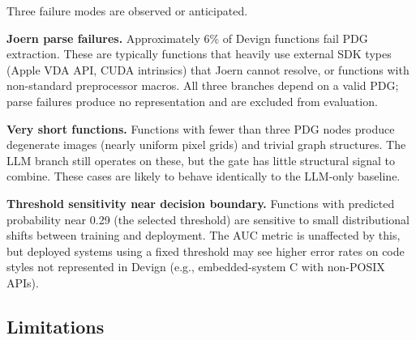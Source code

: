 Three failure modes are observed or anticipated.

\textbf{Joern parse failures.} Approximately 6\% of Devign functions fail PDG
extraction. These are typically functions that heavily use external SDK types
(Apple VDA API, CUDA intrinsics) that Joern cannot resolve, or functions with
non-standard preprocessor macros. All three branches depend on a valid PDG; parse
failures produce no representation and are excluded from evaluation.

\textbf{Very short functions.} Functions with fewer than three PDG nodes produce
degenerate images (nearly uniform pixel grids) and trivial graph structures. The
LLM branch still operates on these, but the gate has little structural signal to
combine. These cases are likely to behave identically to the LLM-only baseline.

\textbf{Threshold sensitivity near decision boundary.} Functions with predicted
probability near 0.29 (the selected threshold) are sensitive to small
distributional shifts between training and deployment. The AUC metric is unaffected
by this, but deployed systems using a fixed threshold may see higher error rates on
code styles not represented in Devign (e.g., embedded-system C with non-POSIX APIs).

\subsection{Limitations}

